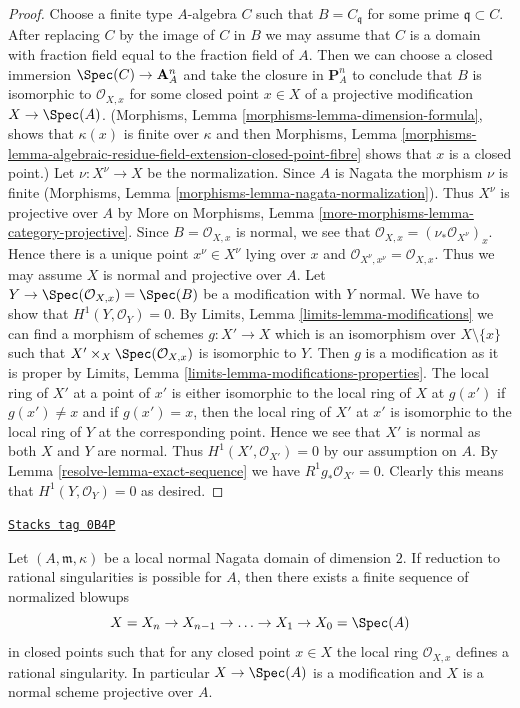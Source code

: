\begin{proof}

Choose a finite type $A$-algebra $C$ such that $B = C_\mathfrak q$
for some prime $\mathfrak q \subset C$. After replacing
$C$ by the image of $C$ in $B$ we may assume that $C$ is a domain
with fraction field equal to the fraction field of $A$.
Then we can choose a closed immersion $\Spec(C) \to \mathbf{A}^n_A$
and take the closure in $\mathbf{P}^n_A$ to conclude that $B$
is isomorphic to $\mathcal{O}_{X, x}$ for some closed point $x \in X$
of a projective modification $X \to \Spec(A)$.
(Morphisms, Lemma \ref{morphisms-lemma-dimension-formula},
shows that $\kappa(x)$ is finite over $\kappa$ and then
Morphisms, Lemma
\ref{morphisms-lemma-algebraic-residue-field-extension-closed-point-fibre}
shows that $x$ is a closed point.)
Let $\nu : X^\nu \to X$ be the normalization.
Since $A$ is Nagata the morphism $\nu$ is finite (Morphisms, Lemma
\ref{morphisms-lemma-nagata-normalization}).
Thus $X^\nu$ is projective over $A$ by
More on Morphisms, Lemma
\ref{more-morphisms-lemma-category-projective}.
Since $B = \mathcal{O}_{X, x}$ is normal, we see that
$\mathcal{O}_{X, x} = (\nu_*\mathcal{O}_{X^\nu})_x$.
Hence there is a unique point $x^\nu \in X^\nu$ lying over $x$
and $\mathcal{O}_{X^\nu, x^\nu} = \mathcal{O}_{X, x}$.
Thus we may assume $X$ is normal and projective over $A$.
Let $Y \to \Spec(\mathcal{O}_{X, x}) = \Spec(B)$
be a modification with $Y$ normal.
We have to show that $H^1(Y, \mathcal{O}_Y) = 0$. By
Limits, Lemma \ref{limits-lemma-modifications}
we can find a morphism of schemes $g : X' \to X$ which is an isomorphism
over $X \setminus \{x\}$ such that $X' \times_X \Spec(\mathcal{O}_{X, x})$
is isomorphic to $Y$. Then $g$ is a modification as it is proper by
Limits, Lemma \ref{limits-lemma-modifications-properties}.
The local ring of $X'$ at a point of $x'$ is either isomorphic
to the local ring of $X$ at $g(x')$ if $g(x') \not = x$ and
if $g(x') = x$, then the local ring of $X'$ at $x'$ is isomorphic
to the local ring of $Y$ at the corresponding point. Hence we see
that $X'$ is normal as both $X$ and $Y$ are normal.
Thus $H^1(X', \mathcal{O}_{X'}) = 0$ by our assumption on $A$.
By Lemma \ref{resolve-lemma-exact-sequence} we have $R^1g_*\mathcal{O}_{X'} = 0$.
Clearly this means that $H^1(Y, \mathcal{O}_Y) = 0$ as desired.
\end{proof}

\begin{lemma}
\label{resolve-lemma-reduce-to-rational}
\href{https://stacks.math.columbia.edu/tag/0B4P}{\texttt{Stacks tag 0B4P}}

Let $(A, \mathfrak m, \kappa)$ be a local normal Nagata domain
of dimension $2$. If reduction to rational singularities is possible
for $A$, then there exists a finite sequence of normalized blowups
$$
X = X_n \to X_{n - 1} \to \ldots \to X_1 \to X_0 = \Spec(A)
$$
in closed points such that for any closed point $x \in X$
the local ring $\mathcal{O}_{X, x}$ defines a rational singularity.
In particular $X \to \Spec(A)$ is a modification and $X$
is a normal scheme projective over $A$.
\end{lemma}

